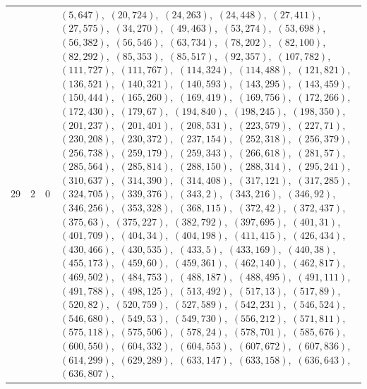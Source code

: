 \documentclass[11pt]{article}
\begin{document}
\begin{longtable}{@{}rrl>{\raggedright\arraybackslash}p{}@{}}
29 & 2 & $0$ & $(5,647)$,\allowbreak\ $(20,724)$,\allowbreak\ $(24,263)$,\allowbreak\ $(24,448)$,\allowbreak\ $(27,411)$,\allowbreak\ $(27,575)$,\allowbreak\ $(34,270)$,\allowbreak\ $(49,463)$,\allowbreak\ $(53,274)$,\allowbreak\ $(53,698)$,\allowbreak\ $(56,382)$,\allowbreak\ $(56,546)$,\allowbreak\ $(63,734)$,\allowbreak\ $(78,202)$,\allowbreak\ $(82,100)$,\allowbreak\ $(82,292)$,\allowbreak\ $(85,353)$,\allowbreak\ $(85,517)$,\allowbreak\ $(92,357)$,\allowbreak\ $(107,782)$,\allowbreak\ $(111,727)$,\allowbreak\ $(111,767)$,\allowbreak\ $(114,324)$,\allowbreak\ $(114,488)$,\allowbreak\ $(121,821)$,\allowbreak\ $(136,521)$,\allowbreak\ $(140,321)$,\allowbreak\ $(140,593)$,\allowbreak\ $(143,295)$,\allowbreak\ $(143,459)$,\allowbreak\ $(150,444)$,\allowbreak\ $(165,260)$,\allowbreak\ $(169,419)$,\allowbreak\ $(169,756)$,\allowbreak\ $(172,266)$,\allowbreak\ $(172,430)$,\allowbreak\ $(179,67)$,\allowbreak\ $(194,840)$,\allowbreak\ $(198,245)$,\allowbreak\ $(198,350)$,\allowbreak\ $(201,237)$,\allowbreak\ $(201,401)$,\allowbreak\ $(208,531)$,\allowbreak\ $(223,579)$,\allowbreak\ $(227,71)$,\allowbreak\ $(230,208)$,\allowbreak\ $(230,372)$,\allowbreak\ $(237,154)$,\allowbreak\ $(252,318)$,\allowbreak\ $(256,379)$,\allowbreak\ $(256,738)$,\allowbreak\ $(259,179)$,\allowbreak\ $(259,343)$,\allowbreak\ $(266,618)$,\allowbreak\ $(281,57)$,\allowbreak\ $(285,564)$,\allowbreak\ $(285,814)$,\allowbreak\ $(288,150)$,\allowbreak\ $(288,314)$,\allowbreak\ $(295,241)$,\allowbreak\ $(310,637)$,\allowbreak\ $(314,390)$,\allowbreak\ $(314,408)$,\allowbreak\ $(317,121)$,\allowbreak\ $(317,285)$,\allowbreak\ $(324,705)$,\allowbreak\ $(339,376)$,\allowbreak\ $(343,2)$,\allowbreak\ $(343,216)$,\allowbreak\ $(346,92)$,\allowbreak\ $(346,256)$,\allowbreak\ $(353,328)$,\allowbreak\ $(368,115)$,\allowbreak\ $(372,42)$,\allowbreak\ $(372,437)$,\allowbreak\ $(375,63)$,\allowbreak\ $(375,227)$,\allowbreak\ $(382,792)$,\allowbreak\ $(397,695)$,\allowbreak\ $(401,31)$,\allowbreak\ $(401,709)$,\allowbreak\ $(404,34)$,\allowbreak\ $(404,198)$,\allowbreak\ $(411,415)$,\allowbreak\ $(426,434)$,\allowbreak\ $(430,466)$,\allowbreak\ $(430,535)$,\allowbreak\ $(433,5)$,\allowbreak\ $(433,169)$,\allowbreak\ $(440,38)$,\allowbreak\ $(455,173)$,\allowbreak\ $(459,60)$,\allowbreak\ $(459,361)$,\allowbreak\ $(462,140)$,\allowbreak\ $(462,817)$,\allowbreak\ $(469,502)$,\allowbreak\ $(484,753)$,\allowbreak\ $(488,187)$,\allowbreak\ $(488,495)$,\allowbreak\ $(491,111)$,\allowbreak\ $(491,788)$,\allowbreak\ $(498,125)$,\allowbreak\ $(513,492)$,\allowbreak\ $(517,13)$,\allowbreak\ $(517,89)$,\allowbreak\ $(520,82)$,\allowbreak\ $(520,759)$,\allowbreak\ $(527,589)$,\allowbreak\ $(542,231)$,\allowbreak\ $(546,524)$,\allowbreak\ $(546,680)$,\allowbreak\ $(549,53)$,\allowbreak\ $(549,730)$,\allowbreak\ $(556,212)$,\allowbreak\ $(571,811)$,\allowbreak\ $(575,118)$,\allowbreak\ $(575,506)$,\allowbreak\ $(578,24)$,\allowbreak\ $(578,701)$,\allowbreak\ $(585,676)$,\allowbreak\ $(600,550)$,\allowbreak\ $(604,332)$,\allowbreak\ $(604,553)$,\allowbreak\ $(607,672)$,\allowbreak\ $(607,836)$,\allowbreak\ $(614,299)$,\allowbreak\ $(629,289)$,\allowbreak\ $(633,147)$,\allowbreak\ $(633,158)$,\allowbreak\ $(636,643)$,\allowbreak\ $(636,807)$,\allowbreak\ 
\end{longtable}
\end{document}
